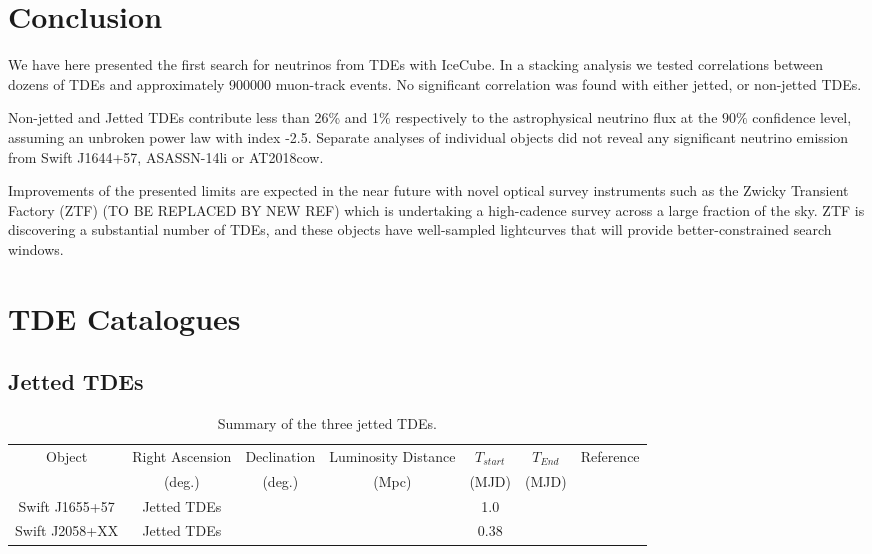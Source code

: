 \documentclass[twocolumn, tighten, linenumbers]{aastex62}
\begin{document}
\section{Conclusion}
\label{sec:Conclusion}
We have here presented the first search for neutrinos from TDEs with IceCube. In a stacking analysis we tested correlations between dozens of TDEs and approximately 900000 muon-track events. No significant correlation was found with either jetted, or non-jetted TDEs.

Non-jetted and Jetted TDEs contribute less than 26\% and 1\% respectively to the astrophysical neutrino flux at the $90\%$ confidence level, assuming an unbroken power law with index -2.5. Separate analyses of individual objects did not reveal any significant neutrino emission from Swift J1644+57, ASASSN-14li or AT2018cow.

Improvements of the presented limits are expected in the near future with novel optical survey instruments such as the Zwicky Transient Factory (ZTF) \citep{2014htu..conf...27B} (TO BE REPLACED BY NEW REF) which is undertaking a high-cadence survey across a large fraction of the sky. ZTF is discovering a substantial number of TDEs, and these objects have well-sampled lightcurves that will provide better-constrained search windows.



\appendix

\section{TDE Catalogues}
\label{sec:tde_cat}

\subsection{Jetted TDEs}

\begin{table}
	\centering
\begin{tabular}{||c c c c ccc|} 
	\hline
	Object & Right Ascension &  Declination  & Luminosity Distance & $T_{start}$ & $T_{End}$ & Reference\\ [0.5ex] 
	& (deg.) & (deg.) & (Mpc) &(MJD) & (MJD) &\\
	\hline\hline
	Swift J1655+57 & Jetted TDEs & && 1.0\\ 
	\hline
	Swift J2058+XX & Jetted TDEs & & & 0.38\\[1ex] 
	\hline
\end{tabular}
\caption{Summary of the three jetted TDEs.}
\label{tab:jetted_cat}
\end{table}
\end{document}
